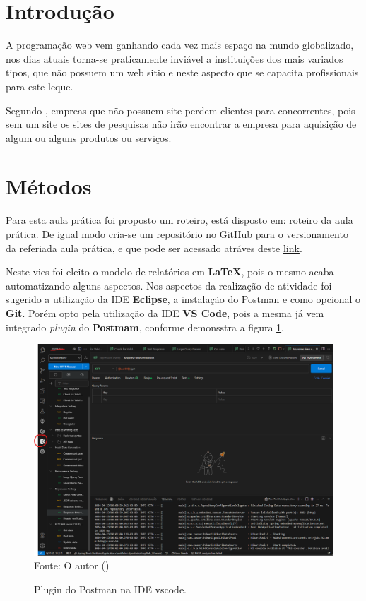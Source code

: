
\section{Introdução}

\par A programação web vem ganhando cada vez mais espaço na mundo globalizado, nos dias atuais torna-se praticamente inviável a instituições dos mais variados tipos, que não possuem um web sitio e neste aspecto que se capacita profissionais para este leque.
\par Segundo , empreas que não possuem site perdem clientes para concorrentes, pois sem um site os sites de pesquisas não irão encontrar a empresa para aquisição de algum ou alguns produtos ou serviços.




\section{Métodos}
\par Para esta aula prática foi proposto um roteiro, está disposto em: \href {https://github.com/ENGENHARIA-DE-SOFTWARE-UNOPAR/web-project/blob/main/Roteiro%20aula%20pr%C3%A1tica.pdf} {roteiro da aula prática}. De igual modo cria-se um repositório no GitHub para o versionamento da referiada aula prática, e que pode ser acessado atráves deste \href {https://github.com/ENGENHARIA-DE-SOFTWARE-UNOPAR/web-project} {link}.
\par Neste vies foi eleito o modelo de relatórios em \textbf{LaTeX}, pois o mesmo acaba automatizando alguns aspectos. Nos aspectos da realização de atividade foi sugerido a utilização da IDE \textbf{Eclipse}, a instalação do \textbf{}{Postman} e como opcional o \textbf{Git}. Porém opto pela utilização da IDE \textbf{VS Code}, pois a mesma já vem integrado \textit{plugin} do \textbf{Postmam}, conforme demonsstra a figura \ref{fig:pos}.

\begin{figure}[H]
\center
  \caption{Plugin do Postman na IDE vscode.}
  \includegraphics[scale=0.45]{figure/postman_vscode.png}
  \label{fig:pos}
  \flushleft %
    {\fontsize{10pt}{\baselineskip}\selectfont
    Fonte: O autor (\the\year) }
\end{figure}

